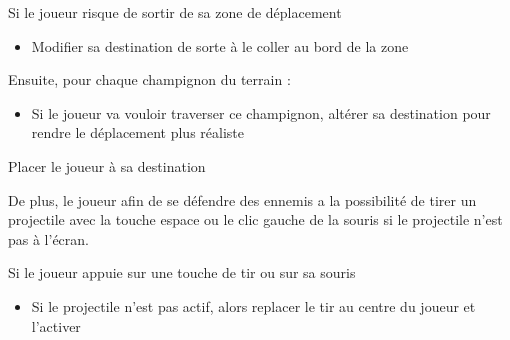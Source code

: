 \begin{algoinfo}
	\item Si le joueur risque de sortir de sa zone de déplacement
	\begin{itemize}
		\item Modifier sa destination de sorte à le coller au bord de la zone
	\end{itemize}
	\item Ensuite, pour chaque champignon du terrain :
	\begin{itemize}
		\item Si le joueur va vouloir traverser ce champignon, altérer sa destination pour rendre le déplacement plus réaliste
	\end{itemize}
	\item Placer le joueur à sa destination
\end{algoinfo}


De plus, le joueur afin de se défendre des ennemis a la possibilité de tirer un projectile avec la touche espace ou le clic gauche de la souris si le projectile n'est pas à l'écran.
\begin{algoinfo}
	\item Si le joueur appuie sur une touche de tir ou sur sa souris
	\begin{itemize}
		\item Si le projectile n'est pas actif, alors replacer le tir au centre du joueur et l'activer
	\end{itemize}
\end{algoinfo}

